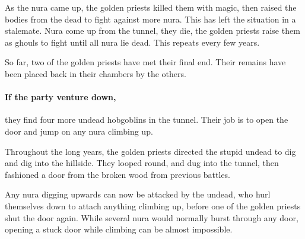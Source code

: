 \begin{multicols}{2}
\begin{exampletext}
As the nura came up, the golden priests killed them with magic, then raised the bodies from the dead to fight against more nura.
This has left the situation in a stalemate.
Nura come up from the tunnel, they die, the golden priests raise them as ghouls to fight until all nura lie dead.
This repeats every few years.

So far, two of the golden priests have met their final end.
Their remains have been placed back in their chambers by the others.

\end{exampletext}


\paragraph{If the party venture down,}
they find four more undead hobgoblins in the tunnel.
Their job is to open the door and jump on any nura climbing up.

\begin{exampletext}

  Throughout the long years, the golden priests directed the stupid undead to dig and dig into the hillside.
  They looped round, and dug into the tunnel, then fashioned a door from the broken wood from previous battles.

Any nura digging upwards can now be attacked by the undead, who hurl themselves down to attach anything climbing up, before one of the golden priests shut the door again.
While several nura would normally burst through any door, opening a stuck door while climbing can be almost impossible.

\end{exampletext}

\end{multicols}
